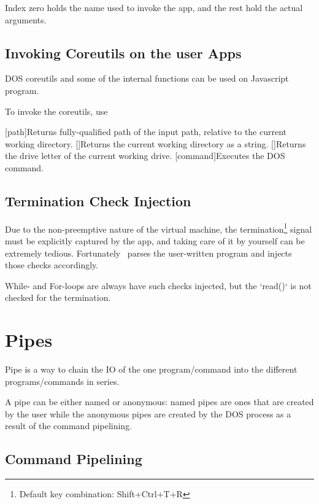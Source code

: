 Index zero holds the name used to invoke the app, and the rest hold the actual arguments.


\section{Invoking Coreutils on the user Apps}

DOS coreutils and some of the internal functions can be used on Javascript program.

To invoke the coreutils, use 

\begin{outline}
\1[path]{Returns fully-qualified path of the input path, relative to the current working directory.}
\1[]{Returns the current working directory as a string.}
\1[]{Returns the drive letter of the current working drive.}
\1[command]{Executes the DOS command.}
\end{outline}


\section{Termination Check Injection}

Due to the non-preemptive nature of the virtual machine, the termination\footnote{Default key combination: Shift+Ctrl+T+R} signal must be explicitly captured by the app, and taking care of it by yourself can be extremely tedious. Fortunately \thedos\ parses the user-written program and injects those checks accordingly.

While- and For-loops are always have such checks injected, but the `read()` is not checked for the termination.


\chapter{Pipes}

Pipe is a way to chain the IO of the one program/command into the different programs/commands in series.

A pipe can be either named or anonymous: named pipes are ones that are created by the user while the anonymous pipes are created by the DOS process as a result of the command pipelining.

\section{Command Pipelining}


